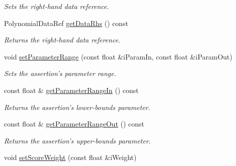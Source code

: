 \begin{DoxyCompactItemize}
\begin{DoxyCompactList}\small\item\em Sets the right-\/hand data reference. \end{DoxyCompactList}\item 
\hypertarget{class_assertion_a0daf687650609e4629d06418152a1985}{Polynomial\-Data\-Ref \hyperlink{class_assertion_a0daf687650609e4629d06418152a1985}{get\-Data\-Rhs} () const }\label{class_assertion_a0daf687650609e4629d06418152a1985}

\begin{DoxyCompactList}\small\item\em Returns the right-\/hand data reference. \end{DoxyCompactList}\item 
\hypertarget{class_assertion_ae761bb8fbc7d1eed09b3a7462139bcb2}{void \hyperlink{class_assertion_ae761bb8fbc7d1eed09b3a7462139bcb2}{set\-Parameter\-Range} (const float \&i\-Param\-In, const float \&i\-Param\-Out)}\label{class_assertion_ae761bb8fbc7d1eed09b3a7462139bcb2}

\begin{DoxyCompactList}\small\item\em Sets the assertion's parameter range. \end{DoxyCompactList}\item 
\hypertarget{class_assertion_a491e7b2bd569988d9e1b3c62ff438a63}{const float \& \hyperlink{class_assertion_a491e7b2bd569988d9e1b3c62ff438a63}{get\-Parameter\-Range\-In} () const }\label{class_assertion_a491e7b2bd569988d9e1b3c62ff438a63}

\begin{DoxyCompactList}\small\item\em Returns the assertion's lower-\/bounds parameter. \end{DoxyCompactList}\item 
\hypertarget{class_assertion_a3c772dd035cea465322b91c8d4629a38}{const float \& \hyperlink{class_assertion_a3c772dd035cea465322b91c8d4629a38}{get\-Parameter\-Range\-Out} () const }\label{class_assertion_a3c772dd035cea465322b91c8d4629a38}

\begin{DoxyCompactList}\small\item\em Returns the assertion's upper-\/bounds parameter. \end{DoxyCompactList}\item 
\hypertarget{class_assertion_a2557fb49a553c4d271abe420e5ea14cd}{void \hyperlink{class_assertion_a2557fb49a553c4d271abe420e5ea14cd}{set\-Score\-Weight} (const float \&i\-Weight)}\label{class_assertion_a2557fb49a553c4d271abe420e5ea14cd}


\end{DoxyCompactItemize}
